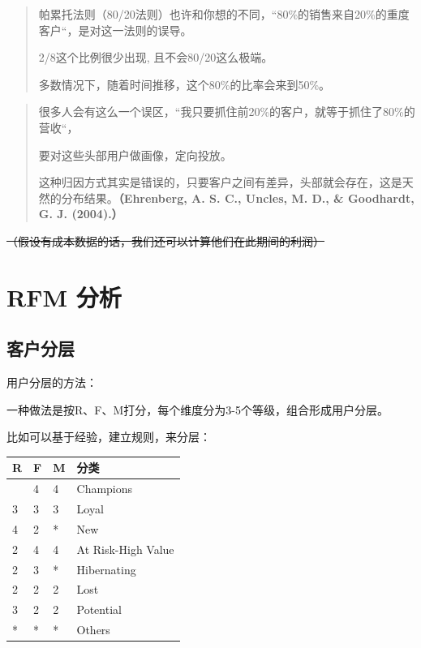 \documentclass[
]{ctexart}
\newcounter{none} %
\begin{document}
\begin{tcolorbox}[enhanced jigsaw, arc=.35mm, bottomrule=.15mm, bottomtitle=1mm, breakable, colback=white, colbacktitle=quarto-callout-tip-color!10!white, colframe=quarto-callout-tip-color-frame, coltitle=black, left=2mm, leftrule=.75mm, opacityback=0, opacitybacktitle=0.6, rightrule=.15mm, title=\textcolor{quarto-callout-tip-color}{\faLightbulb}\hspace{0.5em}{Tip}, titlerule=0mm, toprule=.15mm, toptitle=1mm]

\begin{quote}
帕累托法则（80/20法则）也许和你想的不同，``80\%的销售来自20\%的重度客户``，是对这一法则的误导。

2/8这个比例很少出现, 且不会80/20这么极端。

多数情况下，随着时间推移，这个80\%的比率会来到50\%。
\end{quote}

\end{tcolorbox}

\begin{quote}
很多人会有这么一个误区，``我只要抓住前20\%的客户，就等于抓住了80\%的营收``，

要对这些头部用户做画像，定向投放。

这种归因方式其实是错误的，只要客户之间有差异，头部就会存在，这是天然的分布结果。\textbf{（Ehrenberg,
A. S. C., Uncles, M. D., \& Goodhardt, G. J. (2004).）}
\end{quote}

\st{（假设有成本数据的话，我们还可以计算他们在此期间的利润）}

\section{RFM 分析}\label{rfm-ux5206ux6790}

\subsection{客户分层}\label{ux5ba2ux6237ux5206ux5c42}

用户分层的方法：

一种做法是按R、F、M打分，每个维度分为3-5个等级，组合形成用户分层。

比如可以基于经验，建立规则，来分层：

{\def\LTcaptype{none} %
\begin{longtable}[]{@{}llll@{}}
\toprule\noalign{}
R & F & M & 分类 \\
\midrule\noalign{}
\endhead
\bottomrule\noalign{}
\endlastfoot
4 & 4 & 4 & Champions \\
3 & 3 & 3 & Loyal \\
4 & 2 & * & New \\
2 & 4 & 4 & At Risk-High Value \\
2 & 3 & * & Hibernating \\
2 & 2 & 2 & Lost \\
3 & 2 & 2 & Potential \\
* & * & * & Others \\
\end{longtable}
}
\end{document}
